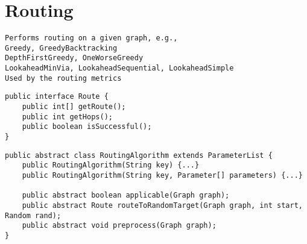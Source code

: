 
\section{Routing}
\label{sec:routing}



\begin{verbatim}
Performs routing on a given graph, e.g.,
Greedy, GreedyBacktracking
DepthFirstGreedy, OneWorseGreedy
LookaheadMinVia, LookaheadSequential, LookaheadSimple
Used by the routing metrics
\end{verbatim}



\begin{lstlisting}[label={lst:routing:route},caption={Route interface}]
public interface Route {
	public int[] getRoute();
	public int getHops();
	public boolean isSuccessful();
}
\end{lstlisting}



\begin{lstlisting}[label={},caption={Basic methods of the RoutingAlgorithm}]
public abstract class RoutingAlgorithm extends ParameterList {
	public RoutingAlgorithm(String key) {...}
	public RoutingAlgorithm(String key, Parameter[] parameters) {...}

	public abstract boolean applicable(Graph graph);
	public abstract Route routeToRandomTarget(Graph graph, int start, Random rand);
	public abstract void preprocess(Graph graph);
}
\end{lstlisting}





